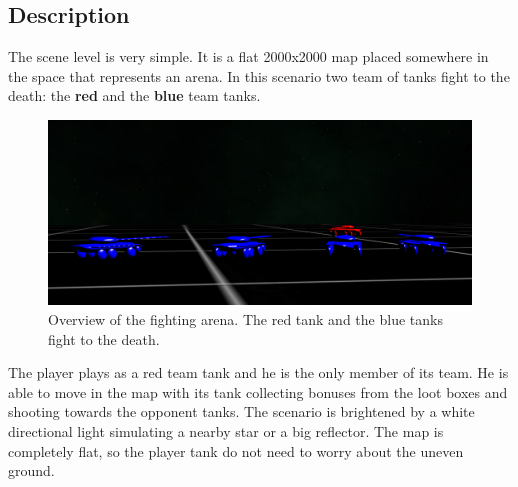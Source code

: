 \documentclass[14pt]{article}
\begin{document}
\subsection{Description}
The scene level is very simple. It is a flat 2000x2000 map placed somewhere in the space that represents an arena. In this scenario two team of tanks fight to the death: the \textbf{red} and the \textbf{blue} team tanks. \\
\begin{figure}[H]
\includegraphics[width = 12cm]{images/scenario3.png}
\caption{Overview of the fighting arena. The red tank and the blue tanks fight to the death.}
\label{img:scenario}
\end{figure}



The player plays as a red team tank and he is the only member of its team. He is able to move in the map with its tank collecting bonuses from the loot boxes and shooting towards the opponent tanks. The scenario is brightened by a white directional light  simulating a nearby star or a big reflector. The map is completely flat, so the player tank do not need to worry about the uneven ground.\\
\end{document}
